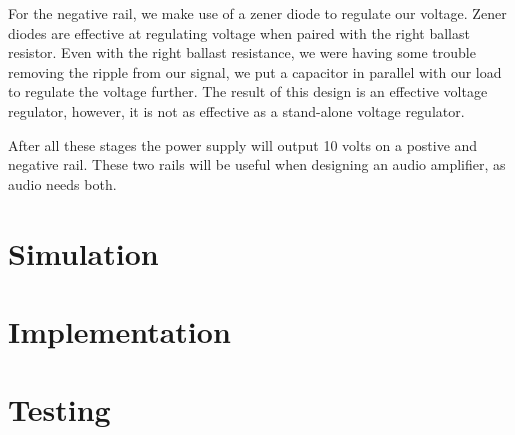 \documentclass{article}
\begin{document}
For the negative rail, we make use of a zener diode to regulate our voltage. Zener diodes are effective at regulating voltage when paired with the right ballast resistor. Even with the right ballast resistance, we were having some trouble removing the ripple from our signal, 
we put a capacitor in parallel with our load to regulate the voltage further. The result of this design is an effective voltage regulator, however, it is not as effective as a stand-alone voltage regulator.

After all these stages the power supply will output 10 volts on a postive and negative rail. These two rails will be useful when designing an audio amplifier, as audio needs both.


\section{Simulation}

\section{Implementation}

\section{Testing}
\end{document}
